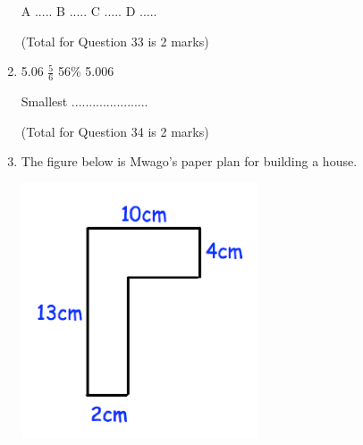 \documentclass{article}
\begin{document}
\begin{enumerate}
\begin{tikzpicture}[x=0.8cm]
\end{tikzpicture}
\vspace{70pt}
\begin{center}
    A ..... \hspace{2cm} B ..... \hspace{2cm} C ..... \hspace{2cm} D .....
\end{center}

\hfill\raggedright (Total for Question 33 is 2 marks) 
\vspace{5pt}
\hline
\vspace{7pt}

\item {} %
\begin{center}
\hspace{2cm} 5.06 \hspace{2cm} \( \displaystyle \frac{5}{6}\) \hspace{2cm} 56\% \hspace{2cm} 5.006 
\vspace{100pt}

Smallest .......\hspace{2cm}.....\hspace{2cm}.....\hspace{2cm}.....\hspace{2cm} \\
\end{center}

\hfill\raggedright (Total for Question 34 is 2 marks) 
\vspace{5pt}
\hline
\vspace{7pt}

\item \quad The figure below is Mwago's paper plan for building a house.  

\begin{center}
\includegraphics[width=7cm]{Exams/cs_1.png} 
\end{center}
\\


\end{enumerate}
\end{document}
